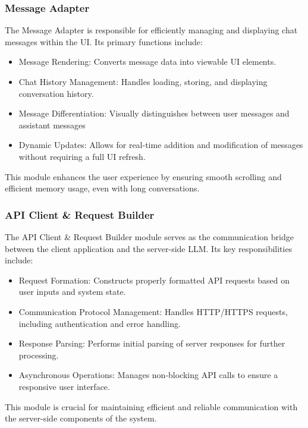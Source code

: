 \subsubsection{Message Adapter}
The Message Adapter is responsible for efficiently managing and displaying chat messages within the UI. Its primary functions include:
\begin{itemize}
    \item Message Rendering: Converts message data into viewable UI elements.
    \item Chat History Management: Handles loading, storing, and displaying conversation history.
    \item Message Differentiation: Visually distinguishes between user messages and assistant messages
    \item Dynamic Updates: Allows for real-time addition and modification of messages without requiring a full UI refresh.
\end{itemize}
This module enhances the user experience by ensuring smooth scrolling and efficient memory usage, even with long conversations.

\subsubsection{API Client \& Request Builder}
The API Client \& Request Builder module serves as the communication bridge between the client application and the server-side LLM. Its key responsibilities include:
\begin{itemize}
    \item Request Formation: Constructs properly formatted API requests based on user inputs and system state.
    \item Communication Protocol Management: Handles HTTP/HTTPS requests, including authentication and error handling.
    \item Response Parsing: Performs initial parsing of server responses for further processing.
    \item Asynchronous Operations: Manages non-blocking API calls to ensure a responsive user interface.
\end{itemize}
This module is crucial for maintaining efficient and reliable communication with the server-side components of the system.

